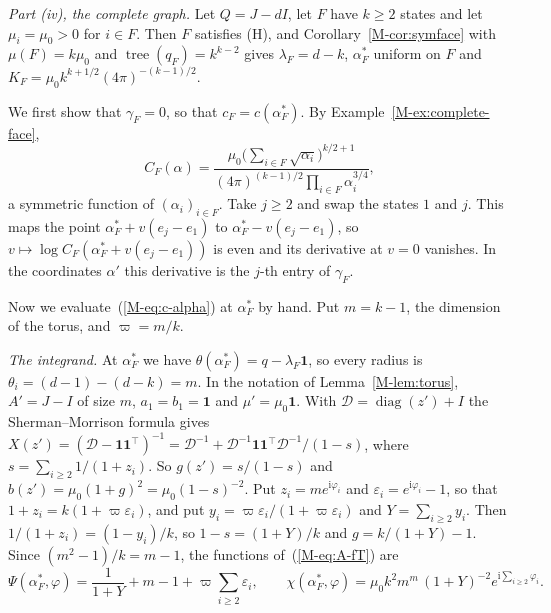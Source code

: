 \documentclass[EJP,preprint]{ejpecp}
\newcommand{\mref}[1]{\ref*{M-#1}}
\newcommand{\meqref}[1]{(\mref{#1})}
\newcommand{\ones}{\mathbf{1}}
\newcommand{\tree}{\operatorname{tree}}
\begin{document}
\emph{Part \textup{(iv)}, the complete graph.} Let $Q=J-dI$, let $F$ have
$k\ge2$ states and let $\mu_i=\mu_0>0$ for $i\in F$. Then $F$ satisfies (H),
and Corollary~\mref{cor:symface} with $\mu(F)=k\mu_0$ and
$\tree(q_F)=k^{k-2}$ gives $\lambda_F=d-k$, $\alpha^*_F$ uniform on $F$ and
$K_F=\mu_0k^{k+1/2}(4\pi)^{-(k-1)/2}$.

We first show that $\gamma_F=0$, so that $c_F=c(\alpha^*_F)$. By
Example~\mref{ex:complete-face},
\[
C_F(\alpha)=\frac{\mu_0\bigl(\sum_{i\in F}\sqrt{\alpha_i}\bigr)^{k/2+1}}
{(4\pi)^{(k-1)/2}\prod_{i\in F}\alpha_i^{3/4}},
\]
a symmetric function of $(\alpha_i)_{i\in F}$. Take $j\ge2$
and swap the states $1$ and $j$. This maps the point
$\alpha^*_F+v(e_j-e_1)$ to $\alpha^*_F-v(e_j-e_1)$, so
$v\mapsto\log C_F(\alpha^*_F+v(e_j-e_1))$ is even and its derivative at $v=0$
vanishes. In the coordinates $\alpha'$ this derivative is the $j$-th entry of
$\gamma_F$.

Now we evaluate~\meqref{eq:c-alpha} at $\alpha^*_F$ by hand. Put $m=k-1$, the dimension of the
torus, and $\varpi=m/k$.

\emph{The integrand.} At $\alpha^*_F$ we have $\theta(\alpha^*_F)=q-\lambda_F\ones$, so every
radius is $\theta_i=(d-1)-(d-k)=m$. In the notation of Lemma~\mref{lem:torus}, $A'=J-I$ of
size $m$, $a_1=b_1=\ones$ and $\mu'=\mu_0\ones$. With $\mathcal D=\operatorname{diag}(z')+I$ the
Sherman--Morrison formula gives $X(z')=(\mathcal D-\ones\ones^\top)^{-1}=\mathcal D^{-1}+\mathcal
D^{-1}\ones\ones^\top\mathcal D^{-1}/(1-s)$, where $s=\sum_{i\ge2}1/(1+z_i)$. So
$g(z')=s/(1-s)$ and $b(z')=\mu_0(1+g)^2=\mu_0(1-s)^{-2}$. Put $z_i=me^{\mathrm i\varphi_i}$ and
$\varepsilon_i=e^{\mathrm i\varphi_i}-1$, so that $1+z_i=k(1+\varpi\varepsilon_i)$, and put
$y_i=\varpi\varepsilon_i/(1+\varpi\varepsilon_i)$ and $Y=\sum_{i\ge2}y_i$. Then
$1/(1+z_i)=(1-y_i)/k$, so $1-s=(1+Y)/k$ and $g=k/(1+Y)-1$. Since $(m^2-1)/k=m-1$,
the functions of~\meqref{eq:A-fT} are
\[
\Psi(\alpha^*_F,\varphi)=\frac1{1+Y}+m-1+\varpi\sum_{i\ge2}\varepsilon_i,\qquad
\chi(\alpha^*_F,\varphi)=\mu_0k^2m^m\,(1+Y)^{-2}e^{\mathrm i\sum_{i\ge2}\varphi_i}.
\]
\end{document}
